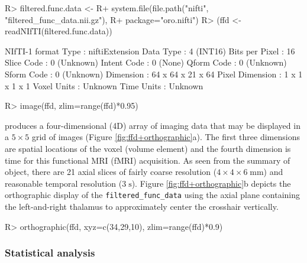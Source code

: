 \documentclass[
]{article}
\begin{document}
\begin{CodeChunk}

\begin{CodeInput}
R> filtered.func.data <- 
R+   system.file(file.path("nifti", "filtered_func_data.nii.gz"), 
R+               package="oro.nifti")
R> (ffd <- readNIfTI(filtered.func.data))
\end{CodeInput}

\begin{CodeOutput}
NIfTI-1 format
  Type            : niftiExtension
  Data Type       : 4 (INT16)
  Bits per Pixel  : 16
  Slice Code      : 0 (Unknown)
  Intent Code     : 0 (None)
  Qform Code      : 0 (Unknown)
  Sform Code      : 0 (Unknown)
  Dimension       : 64 x 64 x 21 x 64
  Pixel Dimension : 1 x 1 x 1 x 1
  Voxel Units     : Unknown
  Time Units      : Unknown
\end{CodeOutput}
\end{CodeChunk}

\begin{CodeChunk}

\begin{CodeInput}
R> image(ffd, zlim=range(ffd)*0.95)
\end{CodeInput}
\end{CodeChunk}

produces a four-dimensional (4D) array of imaging data that may be
displayed in a \(5{\times}5\) grid of images (Figure
\ref{fig:ffd+orthographic}a). The first three dimensions are spatial
locations of the voxel (volume element) and the fourth dimension is time
for this functional MRI (fMRI) acquisition. As seen from the summary of
object, there are 21 axial slices of fairly coarse resolution
(\(4{\times}4{\times}6\;\text{mm}\)) and reasonable temporal resolution
(\(3\;\text{s}\)). Figure \ref{fig:ffd+orthographic}b depicts the
orthographic display of the \texttt{filtered\_func\_data} using the
axial plane containing the left-and-right thalamus to approximately
center the crosshair vertically.

\begin{CodeChunk}

\begin{CodeInput}
R> orthographic(ffd, xyz=c(34,29,10), zlim=range(ffd)*0.9)
\end{CodeInput}
\end{CodeChunk}

\subsubsection{Statistical analysis}
\end{document}
